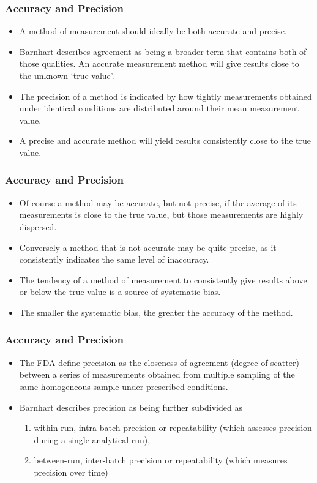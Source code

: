 \documentclass[compress]{beamer}        %
\begin{document}
\begin{frame}
\frametitle{Accuracy and Precision}
\large
\begin{itemize}
\item
A method of measurement should ideally be both accurate and
precise. 
\item \alert{Barnhart} describes agreement as being a broader
term that contains both of those qualities. An accurate
measurement method will give results close to the unknown `true
value'. \item The precision of a method is indicated by how tightly
measurements obtained under identical conditions are distributed
around their mean measurement value.\item A precise and accurate method
will yield results consistently close to the true value. 
\end{itemize}
\end{frame}
\begin{frame}
\frametitle{Accuracy and Precision}
\large
\begin{itemize}
\item Of course
a method may be accurate, but not precise, if the average of its
measurements is close to the true value, but those measurements
are highly dispersed. 
\item
Conversely a method that is not accurate may
be quite precise, as it consistently indicates the same level of
inaccuracy. 
\item The tendency of a method of measurement to
consistently give results above or below the true value is a
source of systematic bias. 
\item The smaller the systematic bias, the
greater the accuracy of the method.
\end{itemize}
\end{frame}
\begin{frame}
\frametitle{Accuracy and Precision}
\large
\begin{itemize}
\item 
The FDA define precision as the closeness of agreement (degree of
scatter) between a series of measurements obtained from multiple
sampling of the same homogeneous sample under prescribed
conditions. \item \alert{Barnhart} describes precision as being further
subdivided as
\begin{enumerate}
\item  within-run, intra-batch precision or
repeatability (which assesses precision during a single analytical
run), 
\item between-run, inter-batch precision or repeatability
(which measures precision over time)
\end{enumerate} 
\end{itemize}
\end{frame}
\end{document}
